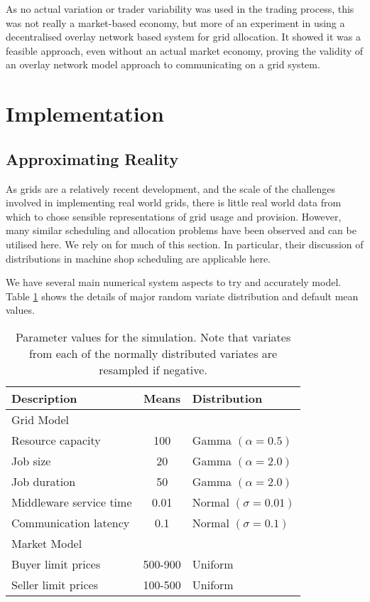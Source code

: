As no actual variation or trader variability was used in the trading process,
this was not really a market-based economy, but more of an experiment in using
a decentralised overlay network based system for grid allocation. It showed it
was a feasible approach, even without an actual market economy, proving the
validity of an overlay network model approach to communicating on a grid
system.

\section{Implementation}

\subsection{Approximating Reality}
\label{SEC:METHOD:DISTRIBUTIONS}

As grids are a relatively recent development, and the scale of the challenges
involved in implementing real world grids, there is little real world data from
which to chose sensible representations of grid usage and provision. However,
many similar scheduling and allocation problems have been observed and can be
utilised here. We rely on \cite{misc-law00-simulation} for much of this section.
In particular, their discussion of distributions in machine shop scheduling
are applicable here.

We have several main numerical system aspects to try and accurately model.
Table \ref{TABLE:METHOD:MEANS} shows the details of major random variate
distribution and default mean values. 

\begin{table}
  \begin{center}
    \begin{tabular}{| l | c | l |}
      \hline
      Description & Means & Distribution \\ 
      \hline
      Grid Model & & \\
      \hline
      Resource capacity	      & 100         & Gamma $(\alpha=0.5)$\\
      Job size			          & 20          & Gamma $(\alpha=2.0)$\\
      Job duration	          & 50          & Gamma $(\alpha=2.0)$\\
      Middleware service time & 0.01         & Normal $(\sigma=0.01)$\\ 
      Communication latency   & 0.1         & Normal $(\sigma=0.1)$\\
      \hline
      Market Model & & \\
      Buyer limit prices & 500-900  & Uniform \\
      Seller limit prices & 100-500 & Uniform \\
      \hline
    \end{tabular}
  \end{center}

  \caption{Parameter values for the simulation.  Note that variates from each
  of the normally distributed variates are resampled if negative.}

  \label{TABLE:METHOD:MEANS}
\end{table}


